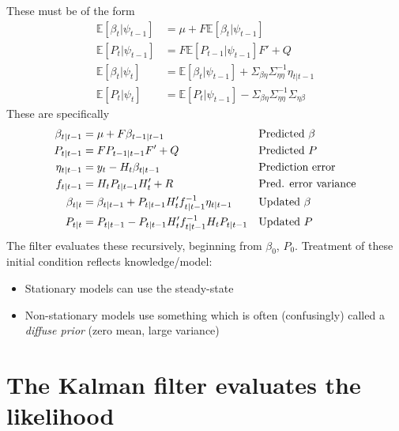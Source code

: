 \documentclass[
  letterpaper,
]{book}
\providecommand{\tightlist}{%
  \setlength{\itemsep}{0pt}\setlength{\parskip}{0pt}}\usepackage{longtable,booktabs,array}
\begin{document}
These must be of the form \begin{align}
\mathbb{E}[\beta_t | \psi_{t-1}] &= \mu + F \mathbb{E} [\beta_t | \psi_{t-1}] \\
\mathbb{E}[P_t|\psi_{t-1}]       &= F \mathbb{E}[P_{t-1}|\psi_{t-1}] F' + Q \\
\mathbb{E}[\beta_t | \psi_t]     &= \mathbb{E}[\beta_t|\psi_{t-1}] + \Sigma_{\beta\eta} \Sigma_{\eta\eta}^{-1}\eta_{t|t-1} \\
\mathbb{E}[P_t|\psi_t]           &= \mathbb{E}[P_t|\psi_{t-1}] -\Sigma_{\beta\eta}\Sigma_{\eta\eta}^{-1}\Sigma_{\eta \beta}
\end{align} These are specifically \begin{align}
\beta_{t|t-1} &= \mu +F\beta_{t-1|t-1}                                  &&\hbox{Predicted } \beta \\
P_{t|t-1}     &= F P_{t-1|t-1}F' + Q                                    &&\hbox{Predicted } P \\
\eta_{t|t-1}  &= y_t-H_t\beta_{t|t-1}                                   &&\hbox{Prediction error} \\
f_{t|t-1}     &= H_t P_{t|t-1}H_t' + R                                  &&\hbox{Pred. error variance} \\
\beta_{t|t}   &= \beta_{t|t-1}+P_{t|t-1}H_t' f_{t|t-1}^{-1}\eta_{t|t-1} &&\hbox{Updated } \beta \\
P_{t|t}       &= P_{t|t-1} - P_{t|t-1}H_t' f_{t|t-1}^{-1}H_tP_{t|t-1}   &&\hbox{Updated } P
\end{align} The filter evaluates these recursively, beginning from
\(\beta_0\), \(P_0\). Treatment of these initial condition reflects
knowledge/model:

\begin{itemize}
\tightlist
\item
  Stationary models can use the steady-state
\item
  Non-stationary models use something which is often (confusingly)
  called a \emph{diffuse prior} (zero mean, large variance)
\end{itemize}

\hypertarget{the-kalman-filter-evaluates-the-likelihood}{%
\section{The Kalman filter evaluates the
likelihood}\label{the-kalman-filter-evaluates-the-likelihood}}
\end{document}
